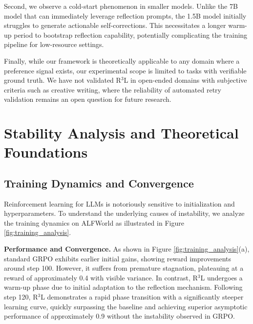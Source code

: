 \documentclass{article} %
\theoremstyle{definition}
\theoremstyle{remark}
\begin{document}
Second, we observe a cold-start phenomenon in smaller models. Unlike the 7B model that can immediately leverage reflection prompts, the 1.5B model initially struggles to generate actionable self-corrections. This necessitates a longer warm-up period to bootstrap reflection capability, potentially complicating the training pipeline for low-resource settings.

Finally, while our framework is theoretically applicable to any domain where a preference signal exists, our experimental scope is limited to tasks with verifiable ground truth. We have not validated R$^3$L in open-ended domains with subjective criteria such as creative writing, where the reliability of automated retry validation remains an open question for future research.




\appendix

\section{Stability Analysis and Theoretical Foundations}
\label{sec:stability}


\subsection{Training Dynamics and Convergence}
\label{sec:training_dynamics}
Reinforcement learning for LLMs is notoriously sensitive to initialization and hyperparameters. To understand the underlying causes of instability, we analyze the training dynamics on ALFWorld as illustrated in Figure \ref{fig:training_analysis}.

\textbf{Performance and Convergence.} As shown in Figure \ref{fig:training_analysis}(a), standard GRPO exhibits earlier initial gains, showing reward improvements around step 100. However, it suffers from premature stagnation, plateauing at a reward of approximately 0.4 with visible variance. In contrast, R$^3$L undergoes a warm-up phase due to initial adaptation to the reflection mechanism. Following step 120, R$^3$L demonstrates a rapid phase transition with a significantly steeper learning curve, quickly surpassing the baseline and achieving superior asymptotic performance of approximately 0.9 without the instability observed in GRPO.
\end{document}
